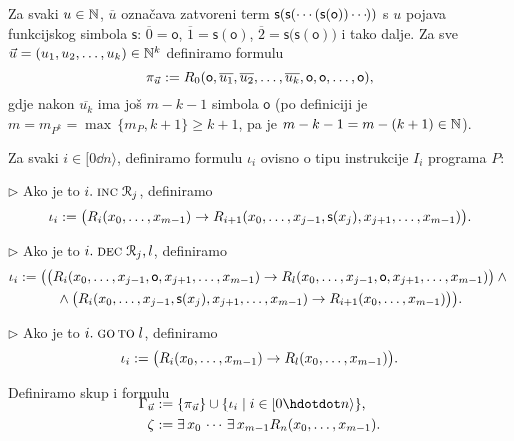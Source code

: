 Za svaki $u\in{\mathbb N}$, $\overline u$ označava zatvoreni term $\mathsf s(\mathsf s(\dotsb(\mathsf s(\mathsf o))\dotsb\mspace{-2mu}))$ s $u$ pojava funkcijskog simbola $\mathsf s$: $\overline 0=\mathsf o$, $\overline 1=\mathsf s(\mathsf o)$, $\overline 2=\mathsf s\bigl(\mathsf s(\mathsf o)\bigr)$ i tako dalje. Za sve $\vec u=(u_1,u_2,\dotsc,u_k)\in{\mathbb N}^k$ definiramo formulu
\begin{equation}\label{eq:defpiu}
    \pi_{\vec u}:=R_0(\mathsf o,\overline{u_1},\overline{u_2},\dotsc,\overline{u_k},\mathsf o,\mathsf o,\dotsc,\mathsf o)\text,
\end{equation}
gdje nakon $\overline{u_k}$ ima još $m-k-1$ simbola $\mathsf o$ (po definiciji je $m=m_{P^k}=\max\,\{m_P,k+1\}\ge k+1$, pa je $m-k-1=m-(k+1)\in{\mathbb N}$).

Za svaki $i\in[0\dd n\rangle$, definiramo formulu $\iota_i$ ovisno o tipu instrukcije $I_i$ programa $P$:
\smallskip

$\rhd$ Ako je to $i.\;\textsc{inc}\;\mathcal R_{j}$, definiramo
    \begin{equation}\label{eq:formINC}
        \iota_i:=\bigl(R_i(x_0,\dotsc,x_{m-1})\to R_{i+1}(x_0,\dotsc,x_{j-1},\mathsf s(x_j),x_{j+1},\dotsc,x_{m-1})\bigr)\text.
    \end{equation}

$\rhd$ Ako je to $i.\;\textsc{dec}\;\mathcal R_{j},l$, definiramo
    \begin{multline}\label{eq:formDEC}
        \iota_i:=\bigl(
        \bigl(
        R_i(x_0,\dotsc,x_{j-1},\mathsf o,x_{j+1},\dotsc,x_{m-1})\to R_l(x_0,\dotsc,x_{j-1},\mathsf o,x_{j+1},\dotsc,x_{m-1})
        \bigr)
        \land{}\\
        {}\land
        \bigl(
        R_i(x_0,\dotsc,x_{j-1},\mathsf s(x_j),x_{j+1},\dotsc,x_{m-1})\to R_{i+1}(x_0,\dotsc,x_{m-1})
        \bigr)
        \bigr)\text.
    \end{multline}

$\rhd$ Ako je to $i.\;\textsc{go\,to}\;l$, definiramo
    \begin{equation}\label{eq:formGOTO}
        \iota_i:=\bigl(R_i(x_0,\dotsc,x_{m-1})\to R_l(x_0,\dotsc,x_{m-1})\bigr)\text.
    \end{equation}

\noindent Definiramo skup i formulu
\begin{align}
\SwapAboveDisplaySkip
    \Gamma_{\vec u}&:=\{\pi_{\vec u}\}\cup\{\iota_i\mid i\in[0\dd n\rangle\}\text,\\
\label{eq:defzeta}
    \zeta&:=\exists\,x_0\,\dotsm\,\exists\, x_{m-1}R_n(x_0,\dotsc,x_{m-1})\text.
\end{align}

